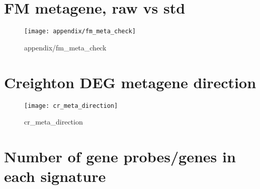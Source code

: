 \begin{appendices}
	\section{FM metagene, raw vs std}
	\label{sec:fm_metagene_raw_vs_std}
	
	\begin{figure}[htpb]
		\centering
		\texttt{[image: appendix/fm\_meta\_check]}
		\caption{appendix/fm_meta_check}
		\label{fig:appendix/fm_meta_check}
	\end{figure}
	

	\section{Creighton DEG metagene direction}
	\label{sec:creighton_deg_metagene_direction}
	
	\begin{figure}[htpb]
		\centering
		\texttt{[image: cr\_meta\_direction]}
		\caption{cr_meta_direction}
		\label{fig:cr_meta_direction}
	\end{figure}
	
	
	\section{Number of gene probes/genes in each signature}
	\label{app:number_of_gene_probes_genes_in_each_signature}
	
	
\end{appendices}
